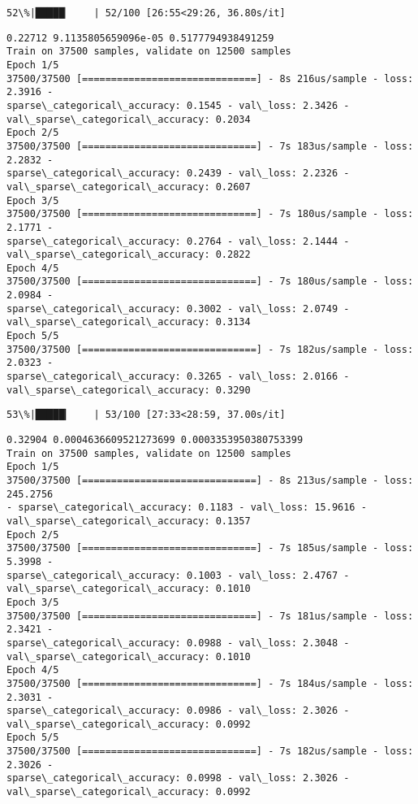 \documentclass[11pt]{article}
\begin{document}
    \begin{Verbatim}[commandchars=\\\{\}]
 52\%|█████▏    | 52/100 [26:55<29:26, 36.80s/it]
    \end{Verbatim}

    \begin{Verbatim}[commandchars=\\\{\}]
0.22712 9.1135805659096e-05 0.5177794938491259
Train on 37500 samples, validate on 12500 samples
Epoch 1/5
37500/37500 [==============================] - 8s 216us/sample - loss: 2.3916 -
sparse\_categorical\_accuracy: 0.1545 - val\_loss: 2.3426 -
val\_sparse\_categorical\_accuracy: 0.2034
Epoch 2/5
37500/37500 [==============================] - 7s 183us/sample - loss: 2.2832 -
sparse\_categorical\_accuracy: 0.2439 - val\_loss: 2.2326 -
val\_sparse\_categorical\_accuracy: 0.2607
Epoch 3/5
37500/37500 [==============================] - 7s 180us/sample - loss: 2.1771 -
sparse\_categorical\_accuracy: 0.2764 - val\_loss: 2.1444 -
val\_sparse\_categorical\_accuracy: 0.2822
Epoch 4/5
37500/37500 [==============================] - 7s 180us/sample - loss: 2.0984 -
sparse\_categorical\_accuracy: 0.3002 - val\_loss: 2.0749 -
val\_sparse\_categorical\_accuracy: 0.3134
Epoch 5/5
37500/37500 [==============================] - 7s 182us/sample - loss: 2.0323 -
sparse\_categorical\_accuracy: 0.3265 - val\_loss: 2.0166 -
val\_sparse\_categorical\_accuracy: 0.3290
    \end{Verbatim}

    \begin{Verbatim}[commandchars=\\\{\}]
 53\%|█████▎    | 53/100 [27:33<28:59, 37.00s/it]
    \end{Verbatim}

    \begin{Verbatim}[commandchars=\\\{\}]
0.32904 0.0004636609521273699 0.0003353950380753399
Train on 37500 samples, validate on 12500 samples
Epoch 1/5
37500/37500 [==============================] - 8s 213us/sample - loss: 245.2756
- sparse\_categorical\_accuracy: 0.1183 - val\_loss: 15.9616 -
val\_sparse\_categorical\_accuracy: 0.1357
Epoch 2/5
37500/37500 [==============================] - 7s 185us/sample - loss: 5.3998 -
sparse\_categorical\_accuracy: 0.1003 - val\_loss: 2.4767 -
val\_sparse\_categorical\_accuracy: 0.1010
Epoch 3/5
37500/37500 [==============================] - 7s 181us/sample - loss: 2.3421 -
sparse\_categorical\_accuracy: 0.0988 - val\_loss: 2.3048 -
val\_sparse\_categorical\_accuracy: 0.1010
Epoch 4/5
37500/37500 [==============================] - 7s 184us/sample - loss: 2.3031 -
sparse\_categorical\_accuracy: 0.0986 - val\_loss: 2.3026 -
val\_sparse\_categorical\_accuracy: 0.0992
Epoch 5/5
37500/37500 [==============================] - 7s 182us/sample - loss: 2.3026 -
sparse\_categorical\_accuracy: 0.0998 - val\_loss: 2.3026 -
val\_sparse\_categorical\_accuracy: 0.0992
    \end{Verbatim}
\end{document}
